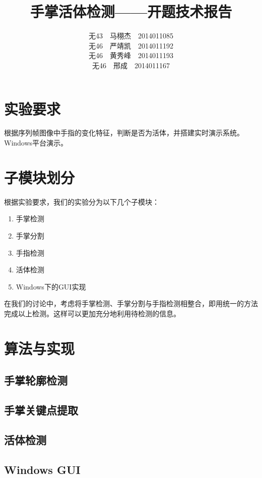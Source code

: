\documentclass[UTF8]{ctexart}
\begin{document}
\title{手掌活体检测——开题技术报告}
\author{无43\ \ 马栩杰\ \ 2014011085\\ 无46\ \ 严靖凯\ \ 2014011192\\ 无46\ \ 黄秀峰\ \ 2014011193\\ 无46\ \ 邢成\ \ 2014011167}
\maketitle

\section{实验要求}

	根据序列帧图像中手指的变化特征，判断是否为活体，并搭建实时演示系统。Windows平台演示。

\section{子模块划分}

	根据实验要求，我们的实验分为以下几个子模块：

	\begin{enumerate}
		\item 手掌检测
		\item 手掌分割
		\item 手指检测
		\item 活体检测
		\item Windows下的GUI实现
	\end{enumerate}

	在我们的讨论中，考虑将手掌检测、手掌分割与手指检测相整合，即用统一的方法完成以上检测。这样可以更加充分地利用待检测的信息。

\section{算法与实现}

	\subsection{手掌轮廓检测}

	\subsection{手掌关键点提取}

	\subsection{活体检测}

	\subsection{Windows GUI}
\end{document}
